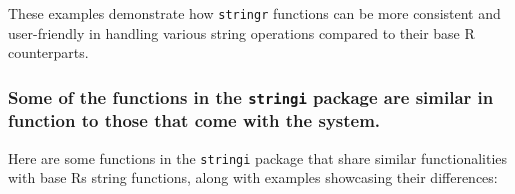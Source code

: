 \documentclass[
]{article}
\begin{document}
These examples demonstrate how \texttt{stringr} functions can be more
consistent and user-friendly in handling various string operations
compared to their base R counterparts.

\hypertarget{some-of-the-functions-in-the-stringi-package-are-similar-in-function-to-those-that-come-with-the-system}{%
\subsubsection{\texorpdfstring{Some of the functions in the
\texttt{stringi} package are similar in function to those that come with
the
system.}{Some of the functions in the stringi package are similar in function to those that come with the system.}}\label{some-of-the-functions-in-the-stringi-package-are-similar-in-function-to-those-that-come-with-the-system}}

Here are some functions in the \texttt{stringi} package that share
similar functionalities with base R\textquotesingle s string functions,
along with examples showcasing their differences:
\end{document}
